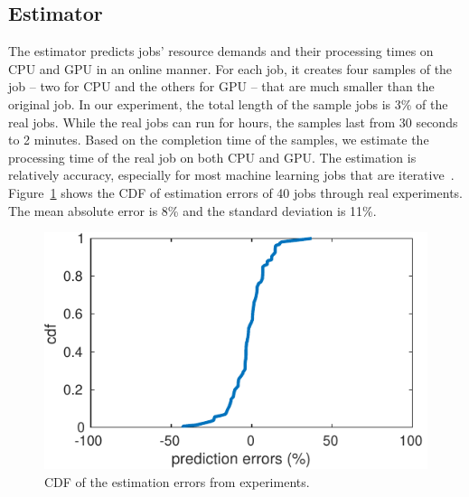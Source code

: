 \subsection{Estimator}\label{sec:profiling}
The estimator predicts jobs' resource demands and their processing times on CPU and GPU in an online manner. %
For each job, it creates four samples of the job -- two for CPU and the others for GPU -- that are much smaller than the original job.
In our experiment, the total length of the sample jobs is 3\% of the real jobs. While the real jobs can run for hours, the samples last from 30 seconds to 2 minutes. 
Based on the completion time of the samples, we estimate the processing time of the real job on both CPU and GPU. The estimation is relatively accuracy, especially for most machine learning jobs that are iterative~\cite{ernest, slaq_socc17}. 
Figure~\ref{fig:prediction_errors_cdf} shows the CDF of estimation errors of 40 jobs through real experiments. The mean absolute error is 8\% and the standard deviation is 11\%. 

\begin{figure}[h]
	\centering
	\includegraphics[width=0.7\linewidth]{figs/prediction_errors_cdf}
	\caption{CDF of the estimation errors from experiments.}
	\label{fig:prediction_errors_cdf}
\end{figure}



